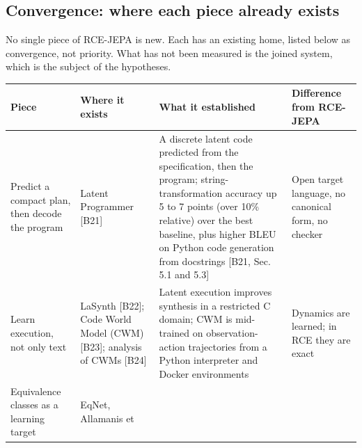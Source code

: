 \documentclass[10pt,letterpaper]{article}
\begin{document}
\subsection{Convergence: where each piece already
exists}\label{convergence-where-each-piece-already-exists}

No single piece of RCE-JEPA is new. Each has an existing home, listed
below as convergence, not priority. What has not been measured is the
joined system, which is the subject of the hypotheses.

{\footnotesize\setlength{\tabcolsep}{3.8pt}\renewcommand{\arraystretch}{1.15}
\begin{longtable}[]{@{}
  >{\raggedright\arraybackslash}p{}
  >{\raggedright\arraybackslash}p{}
  >{\raggedright\arraybackslash}p{}
  >{\raggedright\arraybackslash}p{}@{}}
\toprule\noalign{}
\begin{minipage}[b]{\linewidth}\raggedright
\textbf{Piece}
\end{minipage} & \begin{minipage}[b]{\linewidth}\raggedright
\textbf{Where it exists}
\end{minipage} & \begin{minipage}[b]{\linewidth}\raggedright
\textbf{What it established}
\end{minipage} & \begin{minipage}[b]{\linewidth}\raggedright
\textbf{Difference from RCE-JEPA}
\end{minipage} \\
\midrule\noalign{}
\endhead
\bottomrule\noalign{}
\endlastfoot
Predict a compact plan, then decode the program & Latent Programmer
{[}B21{]} & A discrete latent code predicted from the specification,
then the program; string-transformation accuracy up 5 to 7 points (over
10\% relative) over the best baseline, plus higher BLEU on Python code
generation from docstrings {[}B21, Sec. 5.1 and 5.3{]} & Open target
language, no canonical form, no checker \\
Learn execution, not only text & LaSynth {[}B22{]}; Code World Model
(CWM) {[}B23{]}; analysis of CWMs {[}B24{]} & Latent execution improves
synthesis in a restricted C domain; CWM is mid-trained on
observation-action trajectories from a Python interpreter and Docker
environments & Dynamics are learned; in RCE they are exact \\
Equivalence classes as a learning target & EqNet, Allamanis et

\end{longtable}}
\end{document}
